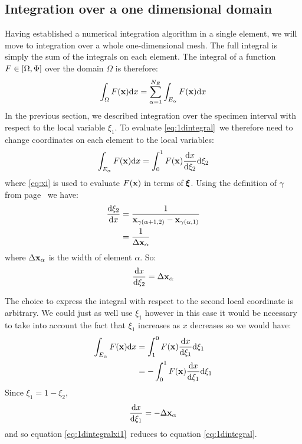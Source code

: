 \documentclass[a4paper, 11pt]{book}
\begin{document}
\subsection{Integration over a one dimensional domain}

Having established a numerical integration algorithm in a single element, we
will move to integration over a whole one-dimensional mesh. The full
integral is simply the sum of the integrals on each element. The integral of
a function $F\in[\Omega,\Phi]$ over the domain $\Omega$ is therefore:
\begin{equation}\label{eq:1dintegral}
  \int_\Omega F(\mathbf{x})\mathrm{d} x=\sum_{\alpha=1}^{N_E}\int_{E_\alpha} F(\mathbf{x})\mathrm{d} x
\end{equation}
In the previous section, we described integration over the specimen interval
with respect to the local variable $\xi_1$. To evaluate
\eqref{eq:1dintegral}\ we therefore need to change coordinates on each
element to the local variables:
\begin{equation}
  \int_{E_\alpha} F(\mathbf{x})\mathrm{d} x = \int_0^1 F(\mathbf{x})\frac{\mathrm{d} x}{\mathrm{d}\xi_2}\mathrm{d}\xi_2
\end{equation}
where \eqref{eq:xi} is used to evaluate $F(\mathbf{x})$ in terms of $\pmb{\xi}$. Using
the definition of $\gamma$ from page \pageref{gamma}\ we have:
\begin{equation}\label{eq:dxidx}
  \begin{split}
    \frac{\mathrm{d}\xi_2}{\mathrm{d} x} 
    &=\frac{1}{\mathbf{x}_{\gamma(\alpha+1,2)}-\mathbf{x}_{\gamma(\alpha,1)}}\\
    &=\frac{1}{\Delta\mathbf{x}_{\alpha}}
  \end{split}
\end{equation}
where $\Delta\mathbf{x}_{\alpha}$ is the width of element $\alpha$. So:
\begin{equation}\label{eq:dxdxi}
    \frac{\mathrm{d} x}{\mathrm{d}\xi_2}= \Delta\mathbf{x}_{\alpha}    
\end{equation}

The choice to express the integral with respect to the second local
coordinate is arbitrary. We could just as well use $\xi_1$ however in this
case it would be necessary to take into account the fact that $\xi_1$
increases as $x$ decreases so we would have:
\begin{equation}\label{eq:1dintegralxi1}
  \begin{split}
    \int_{E_\alpha} F(\mathbf{x})\mathrm{d} x &= \int_1^0 F(\mathbf{x})\frac{\mathrm{d} x}{\mathrm{d}\xi_1}\mathrm{d}\xi_1\\
    &=-\int_0^1 F(\mathbf{x})\frac{\mathrm{d} x}{\mathrm{d}\xi_1}\mathrm{d}\xi_1
  \end{split}
\end{equation}
Since $\xi_1=1-\xi_2$, 
\begin{equation}
  \frac{\mathrm{d} x}{\mathrm{d}\xi_1} =-\Delta\mathbf{x}_{\alpha}
\end{equation}
and so equation \eqref{eq:1dintegralxi1}\ reduces to equation \eqref{eq:1dintegral}.
\end{document}

